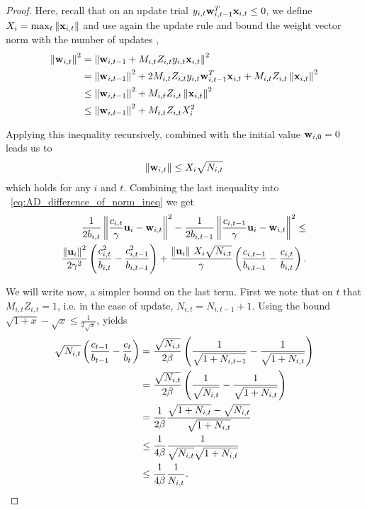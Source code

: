 {\begin{proof}
\noindent
Here, recall that on an update trial $y_{i,t}\mathbf{w}_{i,t-1}^{T}\mathbf{x}_{i,t}\le0$, we define $X_i=\max_t{\Vert\mathbf{x}_{i,t}\Vert}$ 
and use again the update rule and bound the weight vector norm with the number of updates , 
\begin{equation*}
\begin{split}
\left\Vert {\mathbf{w}_{i,t}} \right\Vert^2&=\left\Vert {\mathbf{w}_{i,t-1}+M_{i,t}Z_{i,t}y_{i,t}\mathbf{x}_{i,t}} \right\Vert^2\\
&=\left\Vert {\mathbf{w}_{i,t-1}} \right\Vert^2+ 2M_{i,t}Z_{i,t}y_{i,t}\mathbf{w}_{i,t-1}^{T}\mathbf{x}_{i,t}+M_{i,t}Z_{i,t}\left\Vert {\mathbf{x}_{i,t}} \right\Vert^2\\
&\le\left\Vert {\mathbf{w}_{i,t-1}} \right\Vert^2+M_{i,t}Z_{i,t}\left\Vert {\mathbf{x}_{i,t}} \right\Vert^2\\
&\le\left\Vert {\mathbf{w}_{i,t-1}} \right\Vert^2+M_{i,t}Z_{i,t}X_i^2
\end{split}
\end{equation*}

\noindent
Applying this inequality recursively, combined with the initial value $\mathbf{w}_{i,0}=0$ leads us to
\begin{equation}
\Vert\mathbf{w}_{i,t}\Vert\le X_i\sqrt{N_{i,t}}
\label{eq:AD_bound_on_w}
\end{equation}
which holds for any $i$ and $t$. Combining the last inequality into  ~\eqref{eq:AD_difference_of_norm_ineq} we get
\begin{equation}
\begin{split}
\frac{1}{2b_{i,t}}\left\Vert {\frac{c_{i,t}}{\gamma} \mathbf{u}_i-\mathbf{w}_{i,t}} \right\Vert^2-\frac{1}{2b_{i,t-1}}\left\Vert {\frac{c_{i,t-1}}{\gamma} \mathbf{u}_i-\mathbf{w}_{i,t}} \right\Vert^2\le\\
\frac{\left\Vert {\mathbf{u}_i} \right\Vert^2}{2\gamma^2}\left({\frac{c_{i,t}^2}{b_{i,t}}-\frac{c_{i,t-1}^2}{b_{i,t-1}}}\right)+
\frac{\Vert\mathbf{u}_i\Vert~ X_i\sqrt{ N_{i,t}}}{\gamma}\left({\frac{c_{i,t-1}}{b_{i,t-1}}-\frac{c_{i,t}}{b_{i,t}}}\right).
\label{eq:AD_difference_of_norm_ineq_2}
\end{split}
\end{equation}

\noindent
We will write now, a simpler bound on the last term. First we note that on $t$ that $M_{i,t}Z_{i,t}=1$, i.e. in the case of update, $N_{i,t}=N_{i,t-1}+1$. Using the bound $\sqrt{1+x}-\sqrt{x}\le\frac{1}{2\sqrt{x}}$, yields 
\begin{equation*}
\begin{split}
\sqrt{N_{i,t}}\left({\frac{c_{t-1}}{b_{t-1}}-\frac{c_t}{b_t}}\right)&=\frac{\sqrt{N_{i,t}}}{2\beta}\left({\frac{1}{\sqrt{1+N_{i,t-1}}}-\frac{1}{\sqrt{1+N_{i,t}}}}\right)\\
&=\frac{\sqrt{N_{i,t}}}{2\beta}\left({\frac{1}{\sqrt{N_{i,t}}}-\frac{1}{\sqrt{1+N_{i,t}}}}\right)\\
&=\frac{1}{2\beta}\frac{\sqrt{1+N_{i,t}}-\sqrt{N_{i,t}}}{\sqrt{1+N_{i,t}}}\\
&\le\frac{1}{4\beta}\frac{1}{\sqrt{N_{i,t}}\sqrt{1+N_{i,t}}}\\
&\le\frac{1}{4\beta}\frac{1}{N_{i,t}}.
\end{split}
\end{equation*} 


\end{proof}}
